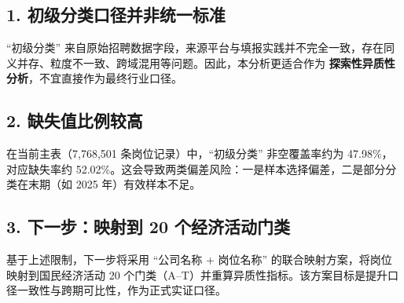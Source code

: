 \documentclass[12pt,a4paper]{ctexart}
\begin{document}
\subsection*{1. 初级分类口径并非统一标准}
``初级分类'' 来自原始招聘数据字段，来源平台与填报实践并不完全一致，存在同义并存、粒度不一致、跨域混用等问题。因此，本分析更适合作为 \textbf{探索性异质性分析}，不宜直接作为最终行业口径。

\subsection*{2. 缺失值比例较高}
在当前主表（7,768,501 条岗位记录）中，``初级分类'' 非空覆盖率约为 47.98\%，对应缺失率约 52.02\%。这会导致两类偏差风险：一是样本选择偏差，二是部分分类在末期（如 2025 年）有效样本不足。

\subsection*{3. 下一步：映射到 20 个经济活动门类}
基于上述限制，下一步将采用 ``公司名称 + 岗位名称'' 的联合映射方案，将岗位映射到国民经济活动 20 个门类（A--T）并重算异质性指标。该方案目标是提升口径一致性与跨期可比性，作为正式实证口径。
\end{document}
